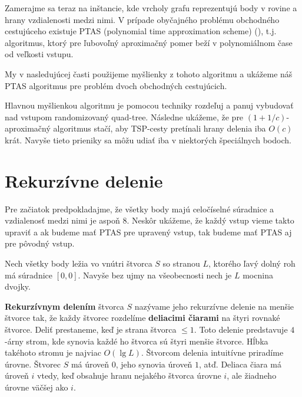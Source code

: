 Zamerajme sa teraz na inštancie, kde vrcholy grafu reprezentujú body v rovine a hrany
vzdialenosti medzi nimi. V prípade obyčajného problému obchodného cestujúceho
existuje PTAS (polynomial time approximation scheme) (\cite{Arora}), t.j. algoritmus, ktorý
pre ľubovoľný aproximačný pomer beží v polynomiálnom čase od veľkosti vstupu.

My v nasledujúcej časti použijeme myšlienky z tohoto algoritmu a ukážeme náš PTAS algoritmus
pre problém dvoch obchodných cestujúcich.

Hlavnou myšlienkou algoritmu je pomocou techniky rozdeľuj a panuj vybudovať nad vstupom
randomizovaný quad-tree. Následne ukážeme, že pre $(1 + 1/c)$-aproximačný algoritmus stačí, aby
TSP-cesty pretínali hrany delenia iba $O(c)$ krát. Navyše tieto prieniky sa môžu
udiať iba v niektorých špeciálnych bodoch.

\section{Rekurzívne delenie}

%

Pre začiatok predpokladajme, že všetky body majú celočíselné súradnice a vzdialenosť
medzi nimi je aspoň $8$. Neskôr ukážeme, že každý vstup vieme takto upraviť a ak budeme mať PTAS
pre upravený vstup, tak budeme mať PTAS aj pre pôvodný vstup.

Nech všetky body ležia vo vnútri štvorca $S$ so stranou $L$, ktorého ľavý dolný roh
má súradnice $[0,0]$. Navyše bez ujmy na všeobecnosti nech je $L$ mocnina dvojky.

{\bf Rekurzívnym delením} štvorca $S$ nazývame jeho rekurzívne delenie na menšie štvorce tak, že
každy štvorec rozdelíme {\bf deliacimi čiarami} na štyri rovnaké štvorce.
Deliť prestaneme, keď je strana štvorca $\leq 1$. Toto delenie predstavuje
$4$-árny strom, kde synovia každé ho štvorca sú štyri menšie štvorce. Hĺbka takéhoto stromu je
najviac $O(\lg L)$. 
Štvorcom delenia intuitívne priradíme úrovne. Štvorec $S$ má úroveň $0$, jeho synovia úroveň $1$,
atď. Deliaca čiara má úroveň $i$ vtedy, keď obsahuje hranu nejakého štvorca úrovne $i$, ale žiadneho
úrovne väčšej ako $i$.


